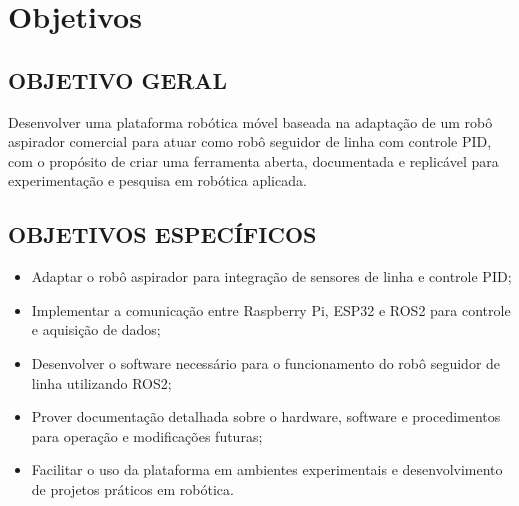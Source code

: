 \chapter{Objetivos}
\section{OBJETIVO GERAL}

Desenvolver uma plataforma robótica móvel baseada na adaptação de um robô aspirador comercial para atuar como robô seguidor de linha com controle PID, com o propósito de criar uma ferramenta aberta, documentada e replicável para experimentação e pesquisa em robótica aplicada.

\section{OBJETIVOS ESPECÍFICOS}
\begin{itemize}
    \item Adaptar o robô aspirador para integração de sensores de linha e controle PID;
    \item Implementar a comunicação entre Raspberry Pi, ESP32 e ROS2 para controle e aquisição de dados;
    \item Desenvolver o software necessário para o funcionamento do robô seguidor de linha utilizando ROS2;
    \item Prover documentação detalhada sobre o hardware, software e procedimentos para operação e modificações futuras;
    \item Facilitar o uso da plataforma em ambientes experimentais e desenvolvimento de projetos práticos em robótica.
\end{itemize}